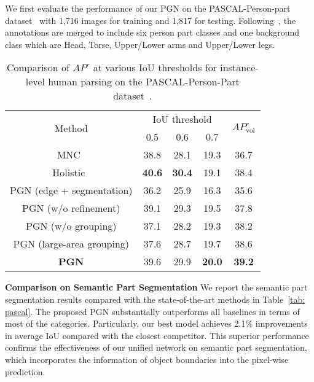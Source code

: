 \documentclass[runningheads]{llncs}
\begin{document}
We first evaluate the performance of our PGN on the PASCAL-Person-part dataset~\cite{chen2014detect} with 1,716 images for training and 1,817 for testing. Following~\cite{chen2015attention,xia2015zoom}, the annotations are merged to include six person part classes and one background class which are Head, Torse, Upper/Lower arms and Upper/Lower legs.



\begin{table}[t]
\centering
\small
\caption{Comparison of $AP^r$ at various IoU thresholds for instance-level human parsing on the PASCAL-Person-Part dataset~\cite{chen2014detect}.}
\tabcolsep 0.15in
\begin{tabular}{ccccc}
\toprule[0.7pt]
\multirow{2}{*}{Method}        & \multicolumn{3}{c}{IoU threshold}   &  \multirow{2}{*}{$AP^r_\text{vol}$}   \\
                               & 0.5           & 0.6           &  0.7          &                  \\ \hline
MNC~\cite{Dai_2016_CVPR}       & 38.8          & 28.1          & 19.3          & 36.7             \\
Holistic~\cite{li2017holistic} & \textbf{40.6} & \textbf{30.4} & 19.1          & 38.4             \\  \hline
PGN (edge + segmentation)      & 36.2          & 25.9          & 16.3          & 35.6             \\
PGN (w/o refinement)           & 39.1          & 29.3          & 19.5          & 37.8             \\
PGN (w/o grouping)             & 37.1          & 28.2          & 19.3          & 38.2             \\
PGN (large-area grouping)      & 37.6          & 28.7          & 19.7          & 38.6             \\     \hline
\textbf{PGN}                   & 39.6          & 29.9          & \textbf{20.0} & \textbf{39.2}    \\
\toprule[0.7pt]
\end{tabular}
\vspace{-8mm}
\label{tab: instance_pascal}
\end{table}


\textbf{Comparison on Semantic Part Segmentation}
We report the semantic part segmentation results compared with the state-of-the-art methods in Table~\ref{tab: pascal}. The proposed PGN substantially outperforms all baselines in terms of most of the categories. Particularly, our best model achieves 2.1\% improvements in average IoU compared with the closest competitor. This superior performance confirms the effectiveness of our unified network on semantic part segmentation, which incorporates the information of object boundaries into the pixel-wise prediction.
\end{document}
